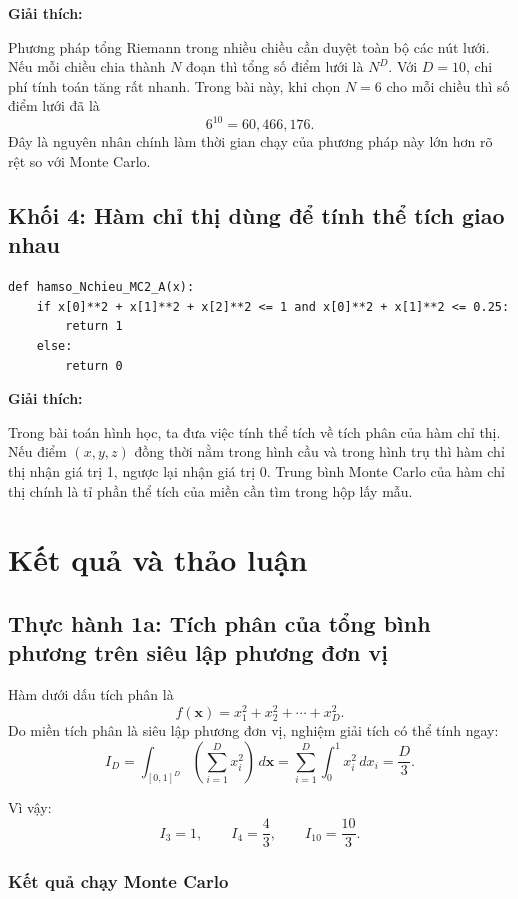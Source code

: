 \documentclass{article}
\begin{document}
\textbf{Giải thích:}

Phương pháp tổng Riemann trong nhiều chiều cần duyệt toàn bộ các nút lưới. Nếu mỗi chiều chia thành $N$ đoạn thì tổng số điểm lưới là $N^D$. Với $D=10$, chi phí tính toán tăng rất nhanh. Trong bài này, khi chọn $N=6$ cho mỗi chiều thì số điểm lưới đã là
\[
6^{10} = 60{,}466{,}176.
\]
Đây là nguyên nhân chính làm thời gian chạy của phương pháp này lớn hơn rõ rệt so với Monte Carlo.

\subsection{Khối 4: Hàm chỉ thị dùng để tính thể tích giao nhau}
\begin{lstlisting}[style=mypython,caption={Hàm chỉ thị cho bài toán thể tích phần giao}]
def hamso_Nchieu_MC2_A(x):
    if x[0]**2 + x[1]**2 + x[2]**2 <= 1 and x[0]**2 + x[1]**2 <= 0.25:
        return 1
    else:
        return 0
\end{lstlisting}

\textbf{Giải thích:}

Trong bài toán hình học, ta đưa việc tính thể tích về tích phân của hàm chỉ thị. Nếu điểm $(x,y,z)$ đồng thời nằm trong hình cầu và trong hình trụ thì hàm chỉ thị nhận giá trị 1, ngược lại nhận giá trị 0. Trung bình Monte Carlo của hàm chỉ thị chính là tỉ phần thể tích của miền cần tìm trong hộp lấy mẫu.

\section{Kết quả và thảo luận}

\subsection{Thực hành 1a: Tích phân của tổng bình phương trên siêu lập phương đơn vị}

Hàm dưới dấu tích phân là
\[
f(\mathbf{x}) = x_1^2 + x_2^2 + \cdots + x_D^2.
\]
Do miền tích phân là siêu lập phương đơn vị, nghiệm giải tích có thể tính ngay:
\[
I_D = \int_{[0,1]^D} \left(\sum_{i=1}^{D} x_i^2\right)
\, d\mathbf{x}
= \sum_{i=1}^{D} \int_0^1 x_i^2\,dx_i
= \frac{D}{3}.
\]

Vì vậy:
\[
I_3 = 1, \qquad I_4 = \frac{4}{3}, \qquad I_{10} = \frac{10}{3}.
\]

\subsubsection{Kết quả chạy Monte Carlo}
\end{document}
